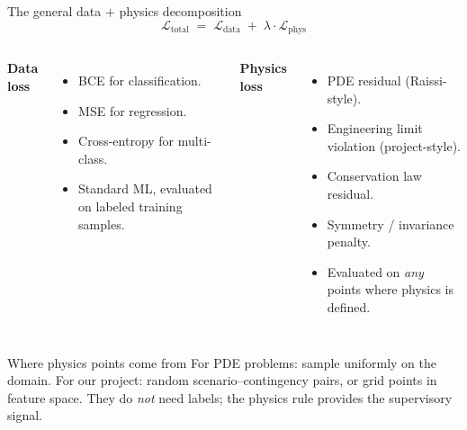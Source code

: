 \documentclass[aspectratio=169,10pt]{beamer}
\begin{document}
\begin{frame}{The general data + physics decomposition}
\begin{equation*}
\boxed{\;\mathcal{L}_{\text{total}} \;=\; \mathcal{L}_{\text{data}} \;+\; \lambda \cdot \mathcal{L}_{\text{phys}}\;}
\end{equation*}
\vspace{0.2em}
\begin{columns}[T]
\textbf{Data loss}
\begin{itemize}
  \item BCE for classification.
  \item MSE for regression.
  \item Cross-entropy for multi-class.
  \item Standard ML, evaluated on labeled training samples.
\end{itemize}
\textbf{Physics loss}
\begin{itemize}
  \item PDE residual (Raissi-style).
  \item Engineering limit violation (project-style).
  \item Conservation law residual.
  \item Symmetry / invariance penalty.
  \item Evaluated on \emph{any} points where physics is defined.
\end{itemize}
\end{columns}
\vspace{0.5em}
\begin{block}{Where physics points come from}
For PDE problems: sample uniformly on the domain. For our project: random scenario--contingency pairs, or grid points in feature space. They do \emph{not} need labels; the physics rule provides the supervisory signal.
\end{block}
\end{frame}
\end{document}
